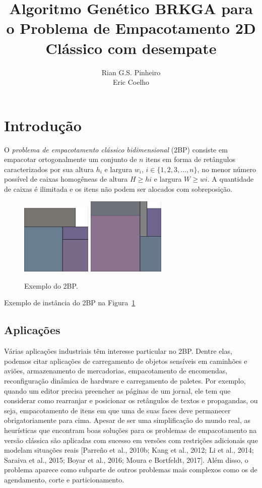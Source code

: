 \documentclass[article]{rian_article}
\author{Rian G.S. Pinheiro\\ \email{rian@ic.ufal.br}\And 
        Eric Coelho\\ \email{esc2@ic.ufal.br}}%
\title{Algoritmo Genético BRKGA para o Problema de Empacotamento 2D 	Clássico com desempate}
\begin{document}
\section{Introdução}

O \textit{problema de empacotamento clássico bidimensional} (2BP) consiste em empacotar ortogonalmente um conjunto de $n$ itens em forma de retângulos caracterizados por sua altura $h_{i}$ e largura $w_{i}$, $i \in \{1, 2, 3, ... , n\}$, no menor número possível de caixas homogêneas de altura $H \geq hi$ e largura $W \geq wi$. A quantidade de caixas é ilimitada e os itens não podem ser alocados com sobreposição.

\begin{figure}[hbt]
\centering
\includegraphics[width=0.3\textwidth]{figs/ex_instance_1.png}\hspace{0.1\textwidth}
\includegraphics[width=0.33\textwidth]{figs/ex_instance_2.png}
\caption{Exemplo do 2BP.} \label{fig:ex}
\end{figure}
 
Exemplo de instância do 2BP na Figura~\ref{fig:ex}

\subsection{Aplicações}
Várias aplicações industriais têm interesse particular no 2BP. Dentre elas, podemos citar aplicações de carregamento de objetos sensíveis em caminhões e aviões, armazenamento de mercadorias, empacotamento de encomendas, reconfiguração dinâmica de hardware e carregamento de paletes. Por exemplo, quando um editor precisa preencher as páginas de um jornal, ele tem que considerar como rearranjar e posicionar os retângulos de textos e propagandas, ou seja, empacotamento de itens em que uma de suas faces deve permanecer obrigatoriamente para cima. Apesar de ser uma simplificação do mundo real, as heurísticas que encontram boas soluções para os problemas de empacotamento na versão clássica são aplicadas com sucesso em versões com restrições adicionais que modelam situações reais [Parreño et al., 2010b; Kang et al., 2012; Li et al., 2014; Saraiva et al., 2015; Boyar et al., 2016; Moura e Bortfeldt, 2017]. Além disso, o problema aparece como subparte de outros problemas mais complexos como os de agendamento, corte e particionamento.
\end{document}

